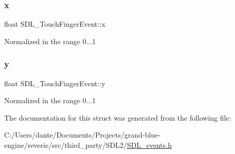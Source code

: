 \subsubsection{\texorpdfstring{x}{x}}
{\footnotesize\ttfamily float S\+D\+L\+\_\+\+Touch\+Finger\+Event\+::x}

Normalized in the range 0...1 \mbox{\label{struct_s_d_l___touch_finger_event_ac2bb8af638d2927a8e13f6ffe8f9384e}} 
\subsubsection{\texorpdfstring{y}{y}}
{\footnotesize\ttfamily float S\+D\+L\+\_\+\+Touch\+Finger\+Event\+::y}

Normalized in the range 0...1 

The documentation for this struct was generated from the following file\+:\begin{DoxyCompactItemize}
\item 
C\+:/\+Users/dante/\+Documents/\+Projects/grand-\/blue-\/engine/reverie/src/third\+\_\+party/\+S\+D\+L2/\mbox{\hyperlink{_s_d_l__events_8h}{S\+D\+L\+\_\+events.\+h}}\end{DoxyCompactItemize}
